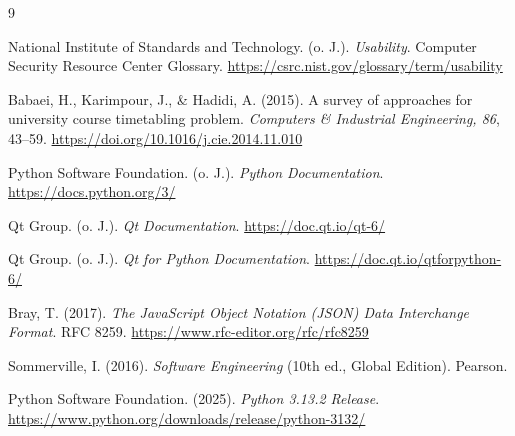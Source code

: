 \documentclass[12pt,a4paper]{article}
\begin{document}
\begin{thebibliography}{9}

National Institute of Standards and Technology. (o. J.).
\textit{Usability}.
Computer Security Resource Center Glossary.
\url{https://csrc.nist.gov/glossary/term/usability}

Babaei, H., Karimpour, J., \& Hadidi, A. (2015). 
A survey of approaches for university course timetabling problem. 
\textit{Computers \& Industrial Engineering, 86}, 43--59. 
\url{https://doi.org/10.1016/j.cie.2014.11.010}

Python Software Foundation. (o. J.). 
\textit{Python Documentation}. 
\url{https://docs.python.org/3/}

Qt Group. (o. J.). 
\textit{Qt Documentation}. 
\url{https://doc.qt.io/qt-6/}

Qt Group. (o. J.). 
\textit{Qt for Python Documentation}. 
\url{https://doc.qt.io/qtforpython-6/}

Bray, T. (2017). 
\textit{The JavaScript Object Notation (JSON) Data Interchange Format}. 
RFC 8259. 
\url{https://www.rfc-editor.org/rfc/rfc8259}

Sommerville, I. (2016).
\textit{Software Engineering} (10th ed., Global Edition).
Pearson.

Python Software Foundation. (2025).
\textit{Python 3.13.2 Release}.
\url{https://www.python.org/downloads/release/python-3132/}

\end{thebibliography}
\end{document}
